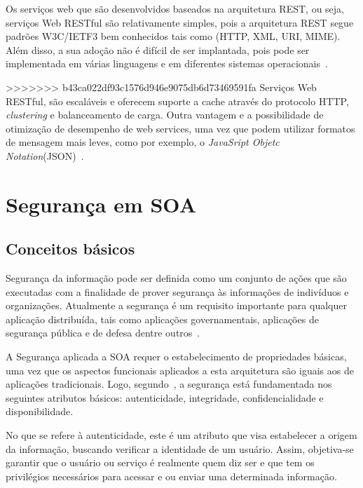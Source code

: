 

%

Os serviços web que são desenvolvidos baseados na arquitetura REST, ou seja, serviços Web RESTful  são relativamente simples, pois a arquitetura REST segue padrões W3C/IETF3 bem conhecidos tais como (HTTP, XML, URI, MIME). Além disso, a sua adoção não é difícil de ser implantada, pois pode ser implementada em várias linguagens e em diferentes sistemas operacionais~\cite{Pautasso2008}.

>>>>>>> b43ca022df93c1576d946e9075db6d73469591fa
Serviços Web RESTful, são escaláveis e oferecem suporte a cache através do protocolo HTTP, \emph{clustering} e balanceamento de carga. Outra vantagem e a possibilidade de otimização de desempenho de web services, uma vez que podem utilizar formatos de mensagem mais leves, como por exemplo, o \emph{JavaSript Objetc Notation}(JSON)~\cite{Pautasso2008}.


\section{Segurança em SOA}

\subsection{Conceitos básicos}

Segurança da informação pode ser definida como um conjunto de ações que são executadas com a finalidade de prover segurança às informações de indivíduos e organizações. Atualmente a segurança é um requisito importante para qualquer aplicação distribuída, tais como aplicações governamentais, aplicações de segurança pública e de defesa dentre outros~\cite{Bertino2010}.

A Segurança aplicada a SOA requer o estabelecimento de propriedades básicas, uma vez que os aspectos funcionais aplicados a esta arquitetura são iguais aos de aplicações tradicionais.  Logo, segundo~\cite{Verissimo2001}, a segurança está fundamentada nos seguintes atributos básicos: autenticidade, integridade, confidencialidade e disponibilidade.

No que se refere à autenticidade, este é um atributo que visa estabelecer a origem da informação, buscando verificar a identidade de um usuário. Assim, objetiva-se garantir que o usuário ou serviço é realmente quem diz ser e que tem os privilégios necessários para acessar e ou enviar uma determinada informação.

